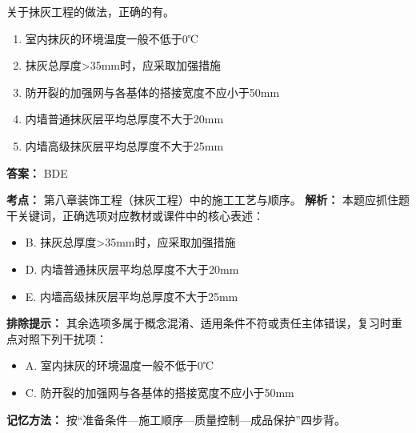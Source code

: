 \documentclass[UTF8,fontset=fandol,11pt]{ctexart}
\begin{document}
\begin{quizbox}[title={第 1 题}]
关于抹灰工程的做法，正确的有。\\
\begin{enumerate}[label=\Alph*.]
\item 室内抹灰的环境温度一般不低于0℃
\item 抹灰总厚度>35mm时，应采取加强措施
\item 防开裂的加强网与各基体的搭接宽度不应小于50mm
\item 内墙普通抹灰层平均总厚度不大于20mm
\item 内墙高级抹灰层平均总厚度不大于25mm
\end{enumerate}
\textbf{答案：} BDE
\vspace{0.25em}
\begin{answerbox}[title={考点解析}]
\textbf{考点：} 第八章装饰工程（抹灰工程）中的施工工艺与顺序。
\textbf{解析：} 本题应抓住题干关键词，正确选项对应教材或课件中的核心表述：
\begin{itemize}
\item B. 抹灰总厚度>35mm时，应采取加强措施
\item D. 内墙普通抹灰层平均总厚度不大于20mm
\item E. 内墙高级抹灰层平均总厚度不大于25mm
\end{itemize}
\textbf{排除提示：} 其余选项多属于概念混淆、适用条件不符或责任主体错误，复习时重点对照下列干扰项：
\begin{itemize}
\item A. 室内抹灰的环境温度一般不低于0℃
\item C. 防开裂的加强网与各基体的搭接宽度不应小于50mm
\end{itemize}
\textbf{记忆方法：} 按“准备条件—施工顺序—质量控制—成品保护”四步背。
\end{answerbox}
\end{quizbox}
\end{document}
